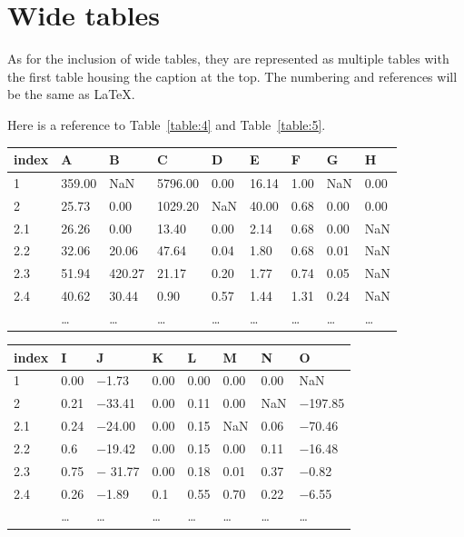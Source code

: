 \section{Wide tables}
As for the inclusion of wide tables, they are represented as multiple tables with
the first table housing the caption at the top. The numbering and references will be
the same as LaTeX.

Here is a reference to Table~\ref{table:4} and Table~\ref{table:5}.
\begin{widetable}
\centering
\begin{tabular}{lllllllll}
\toprule
index  &  A  &  B     & C   &  D  &  E  &  F  &  G  & H  \\
\midrule
1 & 359.00 & NaN & 5796.00 & 0.00 & 16.14 & 1.00 & NaN & 0.00\\
2 & 25.73 & 0.00 & 1029.20 & NaN & 40.00 & 0.68 & 0.00 & 0.00\\
2.1 & 26.26 & 0.00 & 13.40 & 0.00 & 2.14 & 0.68 & 0.00 & NaN\\
2.2 & 32.06 & 20.06 & 47.64 & 0.04 & 1.80 & 0.68 & 0.01 & NaN\\
2.3 & 51.94 & 420.27 & 21.17 & 0.20 & 1.77 & 0.74 & 0.05 & NaN\\
2.4 & 40.62 & 30.44 & \phantom{000}0.90 & 0.57 & 1.44 & 1.31 & 0.24 & NaN\\
 & \ldots & \ldots&  \ldots& \ldots &  \ldots& \ldots& \ldots & \ldots \\
\bottomrule
\end{tabular}
\begin{tabular}{llllllll}
\toprule
index &    I  &  J  &  K  &  L  &  M  &  N & O \\
\midrule
1 & 0.00 & $-$1.73 & 0.00 & 0.00 & 0.00 & 0.00 & NaN\\
2 & 0.21 & $-$33.41 & 0.00 & 0.11 & 0.00 & NaN & $-$197.85\\
2.1 & 0.24 & $-$24.00 & 0.00 & 0.15 & NaN & 0.06 & $-$70.46\\
2.2 & 0.6 & $-$19.42 & 0.00 & 0.15 & 0.00 & 0.11 & $-$16.48\\
2.3 & 0.75 & $-$ 31.77 & 0.00 & 0.18 & 0.01 & 0.37 & $-$0.82\\
2.4 & 0.26 & $-$1.89 & 0.1 & 0.55 & 0.70 & 0.22 & $-$6.55 \\
  &\ldots &  \ldots&  \ldots& \ldots & \ldots & \ldots & \ldots \\
\bottomrule
\end{tabular}
\caption{}
\label{table:4}

\end{widetable}


